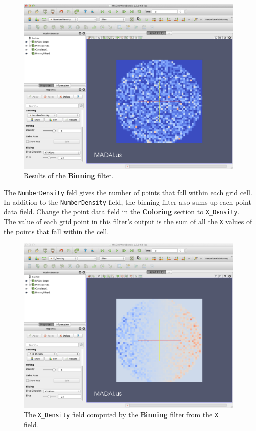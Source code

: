 \documentclass[12pt]{article}
\begin{document}
\begin{figure}[htbp]
   \centering
   \includegraphics[scale=.25]{images/BinningFilter.png} %
   \caption{Results of the \textbf{Binning} filter.}
   \label{fig:BinningFilter}
\end{figure}

The \texttt{NumberDensity} feld gives the number of points that fall within each grid cell. In addition to the \texttt{NumberDensity} field, the binning filter also sums up each point data field. Change the point data field in the \textbf{Coloring} section to \texttt{X\_Density}. The value of each grid point in this filter's output is the sum of all the \texttt{X} values of the points that fall within the cell.

\begin{figure}[htbp]
   \centering
   \includegraphics[scale=.25]{images/BinningFilter_XDensity.png} %
   \caption{The \texttt{X\_Density} field computed by the \textbf{Binning} filter from the \texttt{X} field.}
   \label{fig:BinningFilterXDensity}
\end{figure}
\end{document}
